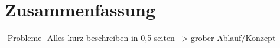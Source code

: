 \section{Zusammenfassung}
-Probleme
-Alles kurz beschreiben in 0,5 seiten  --> grober Ablauf/Konzept